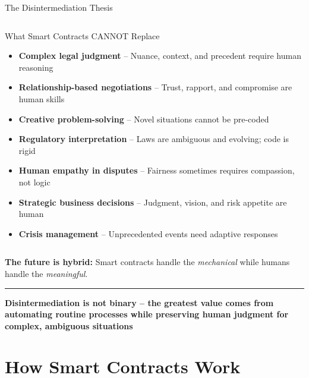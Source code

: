 \documentclass[8pt,aspectratio=169]{beamer}
\newcommand{\bottomnote}[1]{\vfill\vspace{-2mm}\textcolor{mllavender2}{\rule{\textwidth}{0.4pt}}\vspace{1mm}\footnotesize\textbf{#1}}
\begin{document}
\begin{frame}{The Disintermediation Thesis}
\begin{columns}[T]
\begin{alertblock}{What Smart Contracts CANNOT Replace}
\footnotesize
\begin{itemize}
  \item \textcolor{mlred}{\textbf{Complex legal judgment}} -- Nuance, context, and precedent require human reasoning
  \item \textcolor{mlred}{\textbf{Relationship-based negotiations}} -- Trust, rapport, and compromise are human skills
  \item \textcolor{mlred}{\textbf{Creative problem-solving}} -- Novel situations cannot be pre-coded
  \item \textcolor{mlred}{\textbf{Regulatory interpretation}} -- Laws are ambiguous and evolving; code is rigid
  \item \textcolor{mlred}{\textbf{Human empathy in disputes}} -- Fairness sometimes requires compassion, not logic
  \item \textcolor{mlred}{\textbf{Strategic business decisions}} -- Judgment, vision, and risk appetite are human
  \item \textcolor{mlred}{\textbf{Crisis management}} -- Unprecedented events need adaptive responses
\end{itemize}
\end{alertblock}
\end{columns}
\vspace{3mm}
\centering
\textcolor{mlpurple}{\textbf{The future is hybrid:}} Smart contracts handle the \emph{mechanical} while humans handle the \emph{meaningful}.
\bottomnote{Disintermediation is not binary -- the greatest value comes from automating routine processes while preserving human judgment for complex, ambiguous situations}
\end{frame}

\section{How Smart Contracts Work}
\end{document}
